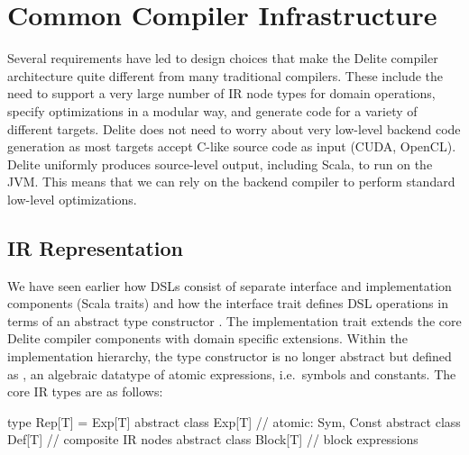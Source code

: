 \section{Common Compiler Infrastructure}
\label{compiler}


Several requirements have led to design choices that make the Delite compiler
architecture quite different from many traditional compilers. These include the
need to support a very large number of IR node types for domain operations,
specify optimizations in a modular way, and generate code for a variety of
different targets.  
Delite does not need to worry about very low-level backend code generation as
most targets accept C-like source code as input (CUDA, OpenCL). Delite uniformly
produces source-level output, including Scala, to run on the JVM. This means that
we can rely on the backend compiler to perform standard low-level optimizations.



\subsection{IR Representation}

We have seen earlier how DSLs consist of separate interface and implementation
components (Scala traits) and how the interface trait defines DSL operations in
terms of an abstract type constructor .  The implementation trait
extends the core Delite compiler components with domain specific
extensions. Within the implementation hierarchy, the type constructor 
is no longer abstract but defined as , an algebraic datatype of atomic
expressions, i.e.\ symbols and constants. The core IR types are as follows:
\begin{listing}
type Rep[T] = Exp[T]
abstract class Exp[T]    // atomic: Sym, Const
abstract class Def[T]    // composite IR nodes
abstract class Block[T]  // block expressions
\end{listing}

